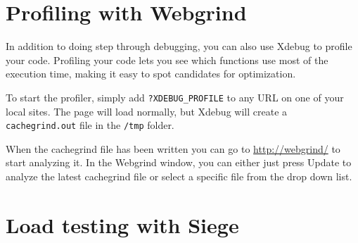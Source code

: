 \documentclass[draft,ebook,10pt,twoside,openright]{memoir}
\begin{document}
\section{Profiling with Webgrind}

In addition to doing step through debugging, you can also use Xdebug to profile your code. Profiling your code lets you see which functions use most of the execution time, making it easy to spot candidates for optimization.

To start the profiler, simply add \verb!?XDEBUG_PROFILE! to any URL on one of your local sites. The page will load normally, but Xdebug will create a \verb!cachegrind.out! file in the \verb!/tmp! folder.

When the cachegrind file has been written you can go to \url{http://webgrind/} to start analyzing it. In the Webgrind window, you can either just press Update to analyze the latest cachegrind file or select a specific file from the drop down list.


\section{Load testing with Siege}
\end{document}
